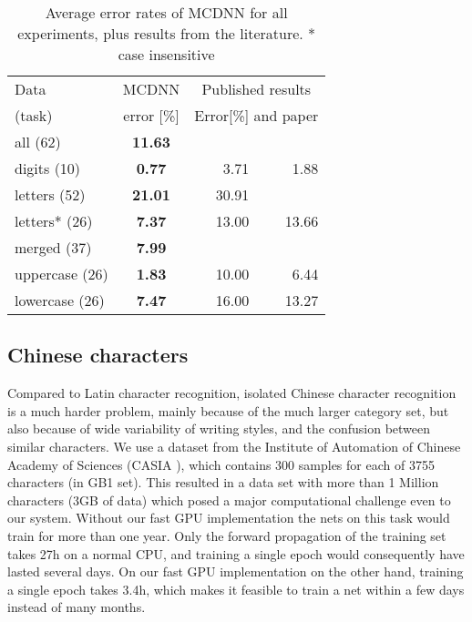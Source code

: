 \documentclass[a4paper]{article}
\begin{document}
\begin{table}[h]
\caption{Average error rates of MCDNN for all experiments, plus results from the literature. * case insensitive}
\label{tab:NISTSD19}
\small
\centering
\begin{tabular}{l|c|rr}
Data 			&  MCDNN			&\multicolumn{2}{c}{Published results}  \\
(task) 		&  error [\%]		&\multicolumn{2}{c}{Error[\%] and paper}\\
\hline
all (62)		&	{\bf11.63} 	& & \\
digits (10)		& 	{\bf0.77}		& 3.71 \cite{granger:2007}& 1.88 \cite{milgram:2005}  \\
letters (52)	& 	{\bf21.01}		& 30.91\cite{KoerichK:2005} & \\
letters* (26)	&  	{\bf7.37}		& 13.00 \cite{cavalin:2006} & 13.66\cite{KoerichK:2005} \\
merged (37)	&	{\bf7.99}		&  & \\ 
uppercase (26)	& 	{\bf1.83}		& 10.00 \cite{cavalin:2006} & 6.44 \cite{dossantos:2008} \\
lowercase (26)	& 	{\bf7.47}		& 16.00 \cite{cavalin:2006}& 13.27 \cite{KoerichK:2005} \\
\end{tabular}
\end{table} 

\subsection{Chinese characters}

Compared to Latin character recognition, isolated Chinese character recognition is a much harder problem, mainly because of the much larger category set, but also because of wide variability of writing styles, and the confusion between similar characters. We use a dataset from the Institute of Automation of Chinese
Academy of Sciences (CASIA \cite{cheng-lin:2010}), which contains 300 samples for each of 3755 characters (in GB1 set). This resulted in a data set with more than 1 Million characters (3GB of data) which posed a major computational challenge even to our system. Without our fast GPU implementation the nets on this task would train for more than one year. Only the forward propagation of the training set takes 27h on a normal CPU, and training a single epoch would consequently have lasted several days. On our fast GPU implementation on the other hand, training a single epoch takes 3.4h, which makes it feasible to train a net within a few days instead of many months. 
\end{document}
